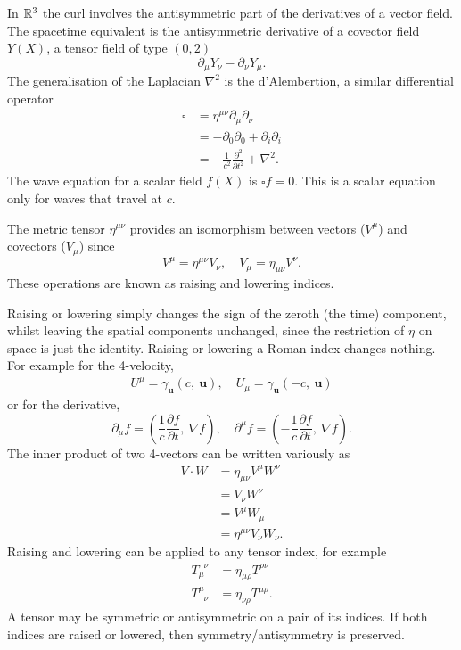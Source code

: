 \documentclass{article}
\newcommand{\glg}{\phantom{\mu}}
\begin{document}
In $ \mathbb{R}^3 $ the curl involves the antisymmetric part of the derivatives of a vector field. The spacetime equivalent is the antisymmetric derivative of a covector field $ Y(X) $, a tensor field of type $ (0,2) $
\[
  \partial_\mu Y_\nu - \partial_\nu Y_\mu.
\]
The generalisation of the Laplacian $ \nabla^2 $ is the d'Alembertion, a similar differential operator
\begin{align*}
	\square &= \eta^{\mu \nu}\partial_\mu\partial_\nu \\
		&= - \partial_0 \partial_0 + \partial_i\partial_i \\
		&= -\frac 1{c^2} \frac{\partial^2}{\partial t^2} + \nabla^2.
\end{align*}
The wave equation for a scalar field $ f(X) $ is $ \square f = 0 $.  This is a scalar equation only for waves that travel at $ c $.
\par
The metric tensor $ \eta^{\mu \nu} $ provides an isomorphism between vectors ($ V^\mu $) and covectors ($ V_\mu $) since
\[
	V^\mu = \eta^{\mu\nu} V_\nu,\quad V_\mu = \eta_{\mu\nu}V^{\nu}.
\]
These operations are known as raising and lowering indices.\par
Raising or lowering simply changes the sign of the zeroth (the time) component, whilst leaving the spatial components unchanged, since the restriction of $ \eta $ on space is just the identity. Raising or lowering a Roman index changes nothing. For example for the 4-velocity,
\begin{align*}
	U^\mu = \gamma_{\mathbf u}(c,\ \mathbf u), \quad U_\mu = \gamma_{\mathbf u}(-c,\ \mathbf u)
\end{align*}
or for the derivative,
\[
	\partial_\mu f = \left(\frac 1c \frac{\partial f}{\partial t},\ \nabla f\right), \quad \partial^\mu f = \left(-\frac 1c \frac{\partial f}{\partial t}, \ \nabla f\right).
\]
The inner product of two 4-vectors can be written variously as
\begin{align*}
	V\cdot W &= \eta_{\mu \nu}V^\mu W^\nu \\
		 &= V_\nu W^\nu \\
		 &= V^\mu W_\mu \\
		 &= \eta^{\mu \nu}V_\nu W_\nu.
\end{align*}
Raising and lowering can be applied to any tensor index, for example
\begin{align*}
	T_{\mu}^{\glg \nu} &= \eta_{\mu \rho}T^{\rho \nu} \\
	T_{\glg \nu}^{\mu} &= \eta_{\nu \rho}T^{\mu \rho}.
\end{align*}
A tensor may be symmetric or antisymmetric on a pair of its indices. If both indices are raised or lowered, then symmetry/antisymmetry is preserved.
\end{document}
